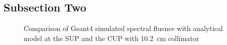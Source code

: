\documentclass[12pt,journal]{IEEEtran}
\let\MYoriglatexcaption\caption
\renewcommand{\caption}[2][\relax]{\MYoriglatexcaption[#2]{#2}}
\begin{document}
\subsection{Subsection Two}
\begin{figure}[!t] 
	\centering    
	\hfil
	\caption{Comparison of Geant4 simulated spectral fluence with analytical model at the SUP and the CUP with \SI{10.2}{\cm} collimator~\cite{Prokofiev2009,Prokofiev14}}
	\label{fig:NYieldComparedSUPCUP10}
\end{figure}
\end{document}
